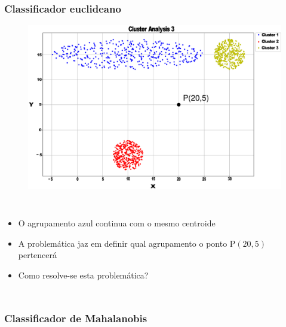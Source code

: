 \documentclass[aspectratio=10]{beamer} %
\begin{document}
\begin{frame}
	\frametitle{Classificador euclideano}
	\begin{figure}[H]
		\includegraphics[scale=0.12]{Imagens/clusteranalise3.eps}
	\end{figure}
	
	\begin{columns}
		\footnotesize
		\justifying
		\begin{itemize}
			\item O agrupamento azul continua com o mesmo centroide
			\pause 
			\item A problemática jaz em definir qual agrupamento o ponto  P$(20,5)$ pertencerá 
			\pause
			\item Como resolve-se esta problemática?
		\end{itemize}
	\end{columns}
\end{frame}

\subsubsection{Classificador de Mahalanobis}
\end{document}
